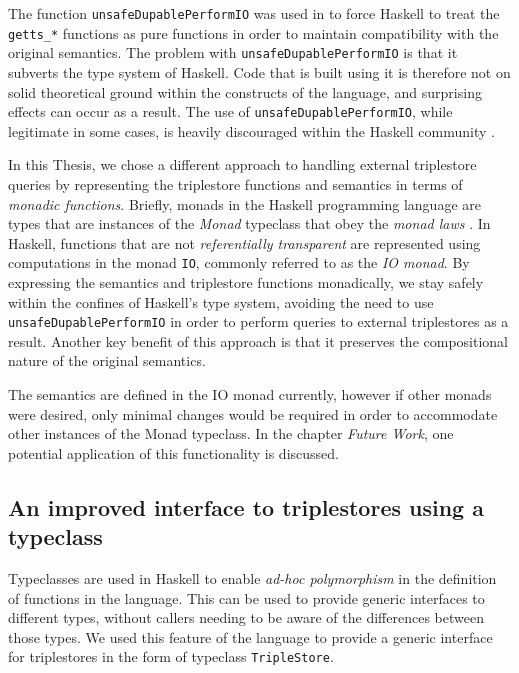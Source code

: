 \documentclass[../main.tex]{subfiles}
\begin{document}
The function \texttt{unsafeDupablePerformIO} was used in \cite{agboola2015extensible} to force Haskell to treat the \texttt{getts\_*} functions as pure functions
in order to maintain compatibility with the original semantics. The problem with \texttt{unsafeDupablePerformIO} is that it subverts the type system of Haskell.  Code that is built using it is therefore not on
solid theoretical ground within the constructs of the language, and surprising effects can occur as a result.  The use of \texttt{unsafeDupablePerformIO}, while
legitimate in some cases, is heavily discouraged within the Haskell community \cite{noUnsafePerformIO}.

In this Thesis, we chose a different approach to handling external triplestore queries by representing the triplestore functions and semantics in terms of {\em monadic functions}.
Briefly, monads in the Haskell programming language are types that are instances of the {\em Monad} typeclass that obey the
{\em monad laws} \cite{monadlaws}.  In Haskell, functions that are not {\em referentially transparent} are represented using computations in the monad \texttt{IO}, commonly referred to as the {\em IO monad}.  By expressing the semantics and triplestore functions monadically, we stay safely within the confines of Haskell's type system, avoiding
the need to use \texttt{unsafeDupablePerformIO} in order to perform queries to external triplestores as a result.  Another key benefit of this approach is that it preserves the compositional nature of the original semantics.

The semantics are defined in the IO monad currently, however if other monads were desired, only minimal changes would be required in order to accommodate
other instances of the Monad typeclass.  In the chapter {\em Future Work}, one potential application of this functionality is discussed.

\subsection{An improved interface to triplestores using a typeclass}

Typeclasses are used in Haskell to enable {\em ad-hoc polymorphism} in the definition of functions in the language.  This can be used
to provide generic interfaces to different types, without callers needing to be aware of the differences between those types.
We used this feature of the language to provide a generic interface for triplestores in the form of typeclass \texttt{TripleStore}.
\end{document}
